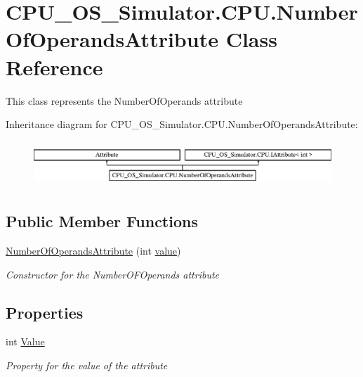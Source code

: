 \hypertarget{class_c_p_u___o_s___simulator_1_1_c_p_u_1_1_number_of_operands_attribute}{}\section{C\+P\+U\+\_\+\+O\+S\+\_\+\+Simulator.\+C\+P\+U.\+Number\+Of\+Operands\+Attribute Class Reference}
\label{class_c_p_u___o_s___simulator_1_1_c_p_u_1_1_number_of_operands_attribute}


This class represents the Number\+Of\+Operands attribute  


Inheritance diagram for C\+P\+U\+\_\+\+O\+S\+\_\+\+Simulator.\+C\+P\+U.\+Number\+Of\+Operands\+Attribute\+:\begin{figure}[H]
\begin{center}
\leavevmode
\includegraphics[height=1.733746cm]{class_c_p_u___o_s___simulator_1_1_c_p_u_1_1_number_of_operands_attribute}
\end{center}
\end{figure}
\subsection*{Public Member Functions}
\begin{DoxyCompactItemize}
\item 
\hyperlink{class_c_p_u___o_s___simulator_1_1_c_p_u_1_1_number_of_operands_attribute_a1976902af3b6dc92e16724d83937816e}{Number\+Of\+Operands\+Attribute} (int \hyperlink{class_c_p_u___o_s___simulator_1_1_c_p_u_1_1_number_of_operands_attribute_a23e7e9d6f0e3af1c7deddce153d13965}{value})
\begin{DoxyCompactList}\small\item\em Constructor for the Number\+O\+F\+Operands attribute \end{DoxyCompactList}\end{DoxyCompactItemize}
\subsection*{Properties}
\begin{DoxyCompactItemize}
\item 
int \hyperlink{class_c_p_u___o_s___simulator_1_1_c_p_u_1_1_number_of_operands_attribute_a00873634b211bcf2fd8b1425aa5143d6}{Value}
\begin{DoxyCompactList}\small\item\em Property for the value of the attribute \end{DoxyCompactList}\end{DoxyCompactItemize}
